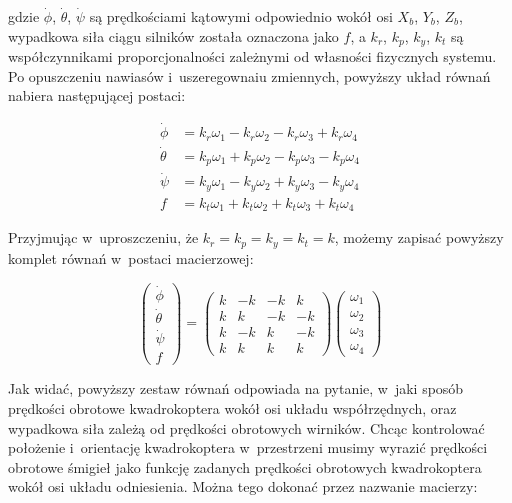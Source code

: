 \documentclass[11pt, twoside]{Thesis} %
\begin{document}
gdzie $\dot{\phi}$, $\dot{\theta}$, $\dot{\psi}$ są prędkościami kątowymi odpowiednio wokół osi $X_b$, $Y_b$, $Z_b$, wypadkowa siła ciągu silników została oznaczona jako $f$, a $k_r$, $k_p$, $k_y$, $k_t$ są współczynnikami proporcjonalności zależnymi od własności fizycznych systemu. Po opuszczeniu nawiasów i~uszeregownaiu zmiennych, powyższy układ równań nabiera następującej postaci:

\begin{equation}
\begin{aligned}
	\dot{\phi} &= k_r\omega_1 - k_r\omega_2 - k_r\omega_3 + k_r\omega_4 \\
	\dot{\theta} &= k_p\omega_1 + k_p\omega_2 - k_p\omega_3 - k_p\omega_4 \\
	\dot{\psi} &= k_y\omega_1 - k_y\omega_2 + k_y\omega_3 - k_y\omega_4 \\
	f &= k_t\omega_1 + k_t\omega_2 + k_t\omega_3 + k_t\omega_4
\end{aligned}
\end{equation}



Przyjmując w~uproszczeniu, że $k_r = k_p = k_y = k_t = k$, możemy zapisać powyższy komplet równań w~postaci macierzowej:

\begin{equation}
	\label{eq:omega_as_argument}
	\begin{pmatrix}
		\dot{\phi} \\
		\dot{\theta} \\
		\dot{\psi} \\
		f
	\end{pmatrix} = 
	\begin{pmatrix}
		k & -k & -k & k \\
		k & k & -k & -k \\
		k & -k & k & -k \\
		k & k & k & k
	\end{pmatrix}
	\begin{pmatrix}
		\omega_1 \\
		\omega_2 \\
		\omega_3 \\
		\omega_4
	\end{pmatrix}
\end{equation}

Jak widać, powyższy zestaw równań odpowiada na pytanie, w~jaki sposób prędkości obrotowe kwadrokoptera wokół osi układu współrzędnych, oraz wypadkowa siła zależą od prędkości obrotowych wirników. Chcąc kontrolować położenie i~orientację kwadrokoptera w~przestrzeni musimy wyrazić prędkości obrotowe śmigieł jako funkcję zadanych prędkości obrotowych kwadrokoptera wokół osi układu odniesienia. Można tego dokonać przez nazwanie macierzy:
\end{document}
